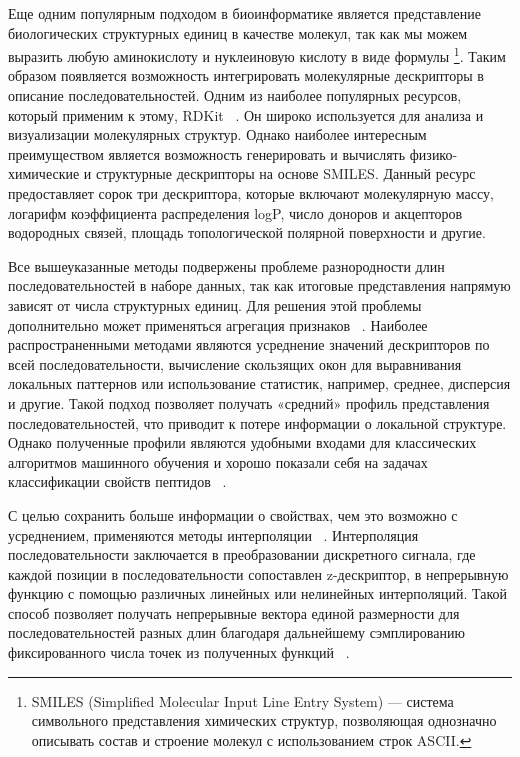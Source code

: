 \documentclass[specification,annotation,times]{itmo-student-thesis}
\begin{document}
Еще одним популярным подходом в биоинформатике является представление биологических структурных единиц в качестве молекул, так как мы можем выразить любую аминокислоту и нуклеиновую кислоту в виде формулы \footnote{SMILES (Simplified Molecular Input Line Entry System) — система символьного представления химических структур, позволяющая однозначно описывать состав и строение молекул с использованием строк ASCII.}. Таким образом появляется возможность интегрировать молекулярные дескрипторы в описание последовательностей. Одним из наиболее популярных ресурсов, который применим к этому, RDKit ~\cite{landrum2013rdkit}. Он широко используется для анализа и визуализации молекулярных структур. Однако наиболее интересным преимуществом является возможность генерировать и вычислять физико-химические и структурные дескрипторы на основе SMILES. Данный ресурс предоставляет сорок три дескриптора, которые включают молекулярную массу, логарифм коэффициента распределения logP, число доноров и акцепторов водородных связей, площадь топологической полярной поверхности и другие.

Все вышеуказанные методы подвержены проблеме разнородности длин последовательностей в наборе данных, так как итоговые представления напрямую зависят от числа структурных единиц. Для решения этой проблемы дополнительно может применяться агрегация признаков ~\cite{hansen2008predicting}. Наиболее распространенными методами являются усреднение значений дескрипторов по всей последовательности, вычисление скользящих окон для выравнивания локальных паттернов или использование статистик, например, среднее, дисперсия и другие. Такой подход позволяет получать «средний» профиль представления последовательностей, что приводит к потере информации о локальной структуре. Однако полученные профили являются удобными входами для классических алгоритмов машинного обучения и хорошо показали себя на задачах классификации свойств пептидов ~\cite{torrent2011connecting}.

С целью сохранить больше информации о свойствах, чем это возможно с усреднением, применяются методы интерполяции ~\cite{heider2011interpol}. Интерполяция последовательности заключается в преобразовании дискретного сигнала, где каждой позиции в последовательности сопоставлен \mbox{z-дескриптор}, в непрерывную функцию с помощью различных линейных или нелинейных интерполяций. Такой способ позволяет получать непрерывные вектора единой размерности для последовательностей разных длин благодаря дальнейшему сэмплированию фиксированного числа точек из полученных функций ~\cite{heider2011interpol, heider2011machine}. 
\end{document}

